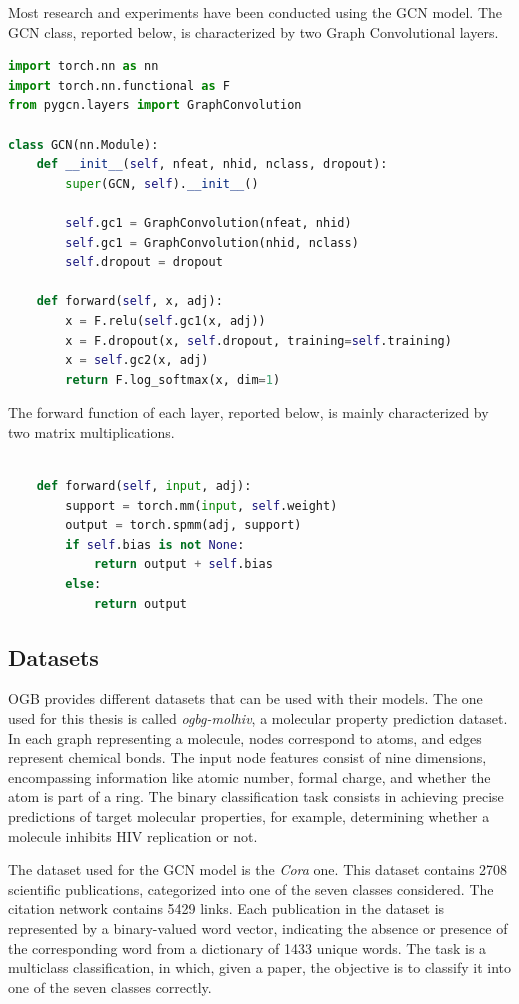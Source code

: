 Most research and experiments have been conducted using the GCN model.
The GCN class, reported below, is characterized by two Graph Convolutional layers.

\begin{lstlisting}[language=Python,label={lst:gcn-class}]
import torch.nn as nn
import torch.nn.functional as F
from pygcn.layers import GraphConvolution

class GCN(nn.Module):
    def __init__(self, nfeat, nhid, nclass, dropout):
        super(GCN, self).__init__()

        self.gc1 = GraphConvolution(nfeat, nhid)
        self.gc1 = GraphConvolution(nhid, nclass)
        self.dropout = dropout

    def forward(self, x, adj):
        x = F.relu(self.gc1(x, adj))
        x = F.dropout(x, self.dropout, training=self.training)
        x = self.gc2(x, adj)
        return F.log_softmax(x, dim=1)
\end{lstlisting}

The forward function of each layer, reported below, is mainly characterized by two matrix multiplications.

\begin{lstlisting}[language=Python,label={lst:gcn-layer-forward}]

    def forward(self, input, adj):
        support = torch.mm(input, self.weight)
        output = torch.spmm(adj, support)
        if self.bias is not None:
            return output + self.bias
        else:
            return output
\end{lstlisting}

\subsection{Datasets}
\label{subsec:gnn_datasets}%

OGB provides different datasets that can be used with their models.
The one used for this thesis is called \textit{ogbg-molhiv}, a molecular property prediction dataset.
In each graph representing a molecule, nodes correspond to atoms, and edges represent chemical bonds.
The input node features consist of nine dimensions, encompassing information like atomic number, formal charge, and whether the atom is part of a ring.
The binary classification task consists in achieving precise predictions of target molecular properties, for example, determining whether a molecule inhibits HIV replication or not.

The dataset used for the GCN model is the \textit{Cora} one.
This dataset contains 2708 scientific publications, categorized into one of the seven classes considered.
The citation network contains 5429 links.
Each publication in the dataset is represented by a binary-valued word vector, indicating the absence or presence of the corresponding word from a dictionary of 1433 unique words.
The task is a multiclass classification, in which, given a paper, the objective is to classify it into one of the seven classes correctly.

